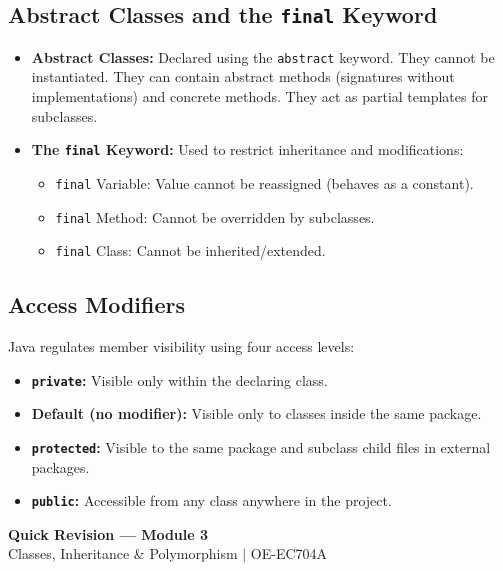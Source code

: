 \documentclass[12pt,a4paper]{article}
\begin{document}
\subsection{Abstract Classes and the \texttt{final} Keyword}
\begin{itemize}[leftmargin=*, itemsep=3.5pt]
  \item \textbf{Abstract Classes:} Declared using the \texttt{abstract} keyword. They cannot be instantiated. They can contain abstract methods (signatures without implementations) and concrete methods. They act as partial templates for subclasses.
  \item \textbf{The \texttt{final} Keyword:} Used to restrict inheritance and modifications:
        \begin{itemize}[leftmargin=*, label=--]
          \item \texttt{final} Variable: Value cannot be reassigned (behaves as a constant).
          \item \texttt{final} Method: Cannot be overridden by subclasses.
          \item \texttt{final} Class: Cannot be inherited/extended.
        \end{itemize}
\end{itemize}

\subsection{Access Modifiers}
Java regulates member visibility using four access levels:
\begin{itemize}[leftmargin=*, itemsep=3pt]
  \item \textbf{\texttt{private}:} Visible only within the declaring class.
  \item \textbf{Default (no modifier):} Visible only to classes inside the same package.
  \item \textbf{\texttt{protected}:} Visible to the same package and subclass child files in external packages.
  \item \textbf{\texttt{public}:} Accessible from any class anywhere in the project.
\end{itemize}

\newpage
\begin{center}
  {\large\bfseries\color{myred} Quick Revision --- Module 3}\\[3pt]
  {\small\color{mydark} Classes, Inheritance \& Polymorphism $|$ OE-EC704A}
\end{center}
\noindent{\color{myred}\rule{\linewidth}{1.2pt}}
\vspace{4pt}
\end{document}
